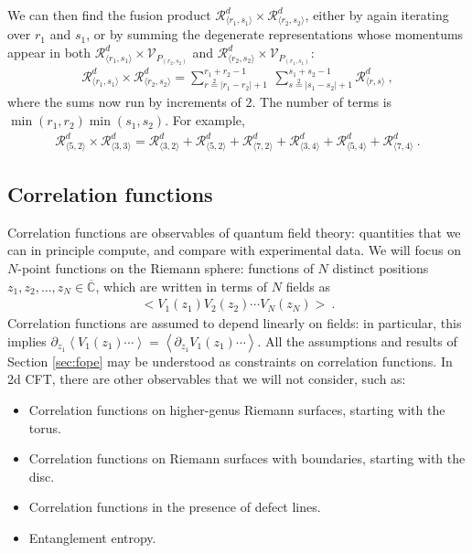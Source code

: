 \documentclass[12pt, a4paper]{article}
\theoremstyle{break}
\begin{document}
We can then find the fusion product $\mathcal{R}^d_{\langle r_1,s_1\rangle}\times \mathcal{R}^d_{\langle r_2,s_2\rangle}$, either by again iterating over $r_1$ and $s_1$, or by summing the degenerate representations whose momentums appear in both  $\mathcal{R}^d_{\langle r_1,s_1\rangle}\times \mathcal{V}_{P_{(r_2,s_2)}}$ and $\mathcal{R}^d_{\langle r_2,s_2\rangle}\times \mathcal{V}_{P_{(r_1,s_1)}}$:
\begin{align}
  \boxed{\mathcal{R}^d_{\langle r_1,s_1 \rangle} \times \mathcal{R}^d_{\langle r_2,s_2 \rangle} = \sum_{r\overset{2}{=}|r_1-r_2|+1}^{r_1+r_2-1}\ \sum_{s\overset{2}{=}|s_1-s_2|+1}^{s_1+s_2-1} \mathcal{R}^d_{\langle r,s \rangle}}\ ,
  \label{rrsr}
\end{align}
where the sums now run by increments of $2$. The number of terms is $\min(r_1,r_2)\min(s_1,s_2)$. For example,
\begin{align}
 \mathcal{R}^d_{\langle 5,2\rangle}\times \mathcal{R}^d_{\langle 3,3\rangle} = \mathcal{R}^d_{\langle 3,2\rangle} + \mathcal{R}^d_{\langle 5, 2\rangle} + \mathcal{R}^d_{\langle 7,2\rangle} +\mathcal{R}^d_{\langle 3,4\rangle}+\mathcal{R}^d_{\langle 5,4\rangle} + \mathcal{R}^d_{\langle 7,4\rangle} \ .
\end{align}



\subsection{Correlation functions}\label{sec:cor}

Correlation functions are observables of quantum field theory: quantities that we can in principle compute, and compare with experimental data. We will focus on $N$-point functions on the Riemann sphere: functions of $N$ distinct positions $z_1,z_2,\dots, z_N\in \overline{\mathbb{C}}$, which are written in terms of $N$ fields as 
\begin{align}
 \Big< V_1(z_1) V_2(z_2) \cdots V_N(z_N)\Big>\ . 
\end{align}
Correlation functions are assumed to depend linearly on fields: in particular, this implies $\partial_{z_1}\left<  V_1(z_1) \cdots \right> = \left< \partial_{z_1} V_1(z_1) \cdots \right>$.
All the assumptions and results of Section \ref{sec:fope} may be understood as constraints on correlation functions. 
In 2d CFT, there are other observables that we will not consider, such as: 
\begin{itemize}
 \item Correlation functions on higher-genus Riemann surfaces, starting with the torus. 
 \item Correlation functions on Riemann surfaces with boundaries, starting with the disc. 
 \item Correlation functions in the presence of defect lines. 
 \item Entanglement entropy. 
\end{itemize}
\end{document}
